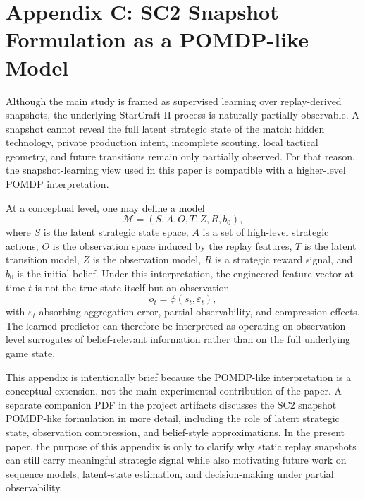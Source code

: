 \documentclass[11pt,a4paper]{article}
\begin{document}
\section{Appendix C: SC2 Snapshot Formulation as a POMDP-like Model}
\label{app:pomdp}
Although the main study is framed as supervised learning over replay-derived snapshots, the underlying StarCraft II process is naturally partially observable. A snapshot cannot reveal the full latent strategic state of the match: hidden technology, private production intent, incomplete scouting, local tactical geometry, and future transitions remain only partially observed. For that reason, the snapshot-learning view used in this paper is compatible with a higher-level POMDP interpretation.

At a conceptual level, one may define a model
\[
\mathcal{M} = (S, A, O, T, Z, R, b_0),
\]
where $S$ is the latent strategic state space, $A$ is a set of high-level strategic actions, $O$ is the observation space induced by the replay features, $T$ is the latent transition model, $Z$ is the observation model, $R$ is a strategic reward signal, and $b_0$ is the initial belief. Under this interpretation, the engineered feature vector at time $t$ is not the true state itself but an observation
\[
o_t = \phi(s_t, \varepsilon_t),
\]
with $\varepsilon_t$ absorbing aggregation error, partial observability, and compression effects. The learned predictor can therefore be interpreted as operating on observation-level surrogates of belief-relevant information rather than on the full underlying game state.

This appendix is intentionally brief because the POMDP-like interpretation is a conceptual extension, not the main experimental contribution of the paper. A separate companion PDF in the project artifacts discusses the SC2 snapshot POMDP-like formulation in more detail, including the role of latent strategic state, observation compression, and belief-style approximations. In the present paper, the purpose of this appendix is only to clarify why static replay snapshots can still carry meaningful strategic signal while also motivating future work on sequence models, latent-state estimation, and decision-making under partial observability.
\end{document}
